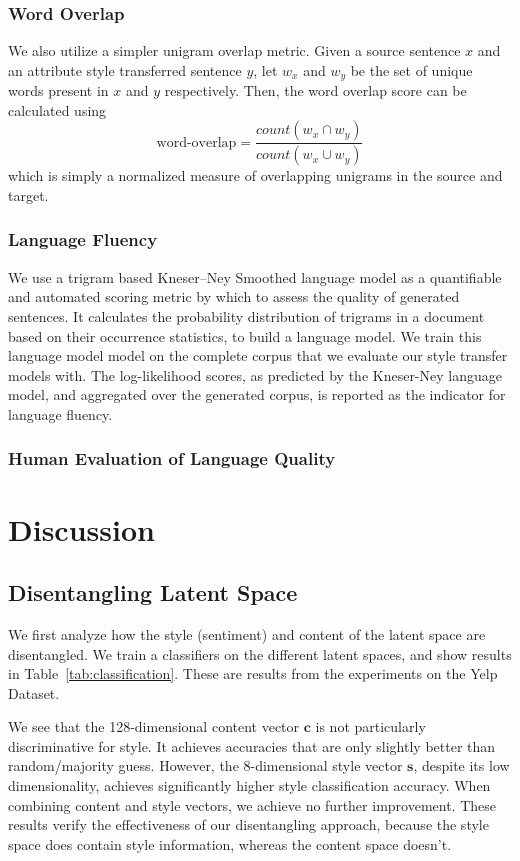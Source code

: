 \documentclass[11pt,a4paper]{article}
\begin{document}
\subsubsection{Word Overlap}
We also utilize a simpler unigram overlap metric. Given a source sentence $x$ and an attribute style transferred sentence $y$, let $w_x$ and $w_y$ be the set of unique words present in $x$ and $y$ respectively. Then, the word overlap score can be calculated using $$\text{word-overlap} = \frac{count(w_x \cap w_y)}{count(w_x \cup w_y)}$$ which is simply a normalized measure of overlapping unigrams in the source and target.

\subsubsection{Language Fluency}
We use a trigram based Kneser–Ney Smoothed language model \citep{kneser1995improved} as a quantifiable and automated scoring metric by which to assess the quality of generated sentences. It calculates the probability distribution of trigrams in a document based on their occurrence statistics, to build a language model. We train this language model model on the complete corpus that we evaluate our style transfer models with. The log-likelihood scores, as predicted by the Kneser-Ney language model, and aggregated over the generated corpus, is reported as the indicator for language fluency.

\subsubsection{Human Evaluation of Language Quality}




\section{Discussion}

\subsection{Disentangling Latent Space}

We first analyze how the style (sentiment) and content of the latent space are disentangled. We train a classifiers on the different latent spaces, and show results in Table~\ref{tab:classification}. These are results from the experiments on the Yelp Dataset.

We see that the 128-dimensional content vector $\bm c$ is not particularly discriminative for style. It achieves accuracies that are only slightly better than random/majority guess. However, the 8-dimensional style vector $\bm s$, despite its low dimensionality, achieves significantly higher style classification accuracy. When combining content and style vectors, we achieve no further improvement. These results verify the effectiveness of our disentangling approach, because the style space does contain style information, whereas the content space doesn't.
\end{document}
